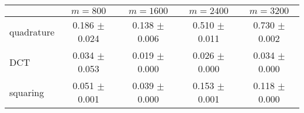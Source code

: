 \centering
\renewcommand{\arraystretch}{1.2}
\begin{tabular}{@{}lcccc@{}}
\toprule
 & $m=800$ & $m=1600$ & $m=2400$ & $m=3200$\\
\midrule
quadrature & 0.186 $\pm$ 0.024 & 0.138 $\pm$ 0.006 & 0.510 $\pm$ 0.011 & 0.730 $\pm$ 0.002 \\
DCT & 0.034 $\pm$ 0.053 & 0.019 $\pm$ 0.000 & 0.026 $\pm$ 0.000 & 0.034 $\pm$ 0.000 \\
squaring & 0.051 $\pm$ 0.001 & 0.039 $\pm$ 0.000 & 0.153 $\pm$ 0.001 & 0.118 $\pm$ 0.000 \\
\bottomrule
\end{tabular}
